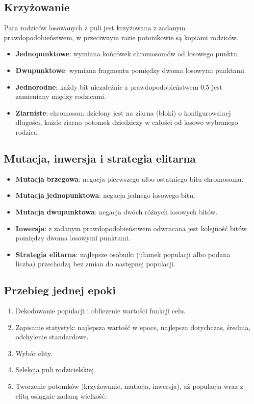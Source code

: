 \documentclass[11pt,a4paper]{article}
\begin{document}
\subsection{Krzyżowanie}
Para rodziców losowanych z puli jest krzyżowana z zadanym prawdopodobieństwem, w przeciwnym
razie potomkowie są kopiami rodziców.
\begin{itemize}
  \item \textbf{Jednopunktowe}: wymiana końcówek chromosomów od losowego punktu.
  \item \textbf{Dwupunktowe}: wymiana fragmentu pomiędzy dwoma losowymi punktami.
  \item \textbf{Jednorodne}: każdy bit niezależnie z prawdopodobieństwem 0.5 jest zamieniany między rodzicami.
  \item \textbf{Ziarniste}: chromosom dzielony jest na ziarna (bloki) o konfigurowalnej długości,
        każde ziarno potomek dziedziczy w całości od losowo wybranego rodzica.
\end{itemize}

\subsection{Mutacja, inwersja i strategia elitarna}
\begin{itemize}
  \item \textbf{Mutacja brzegowa}: negacja pierwszego albo ostatniego bitu chromosomu.
  \item \textbf{Mutacja jednopunktowa}: negacja jednego losowego bitu.
  \item \textbf{Mutacja dwupunktowa}: negacja dwóch różnych losowych bitów.
  \item \textbf{Inwersja}: z zadanym prawdopodobieństwem odwracana jest kolejność bitów
        pomiędzy dwoma losowymi punktami.
  \item \textbf{Strategia elitarna}: najlepsze osobniki (ułamek populacji albo podana liczba)
        przechodzą bez zmian do następnej populacji.
\end{itemize}

\subsection{Przebieg jednej epoki}
\begin{enumerate}
  \item Dekodowanie populacji i obliczenie wartości funkcji celu.
  \item Zapisanie statystyk: najlepsza wartość w epoce, najlepsza dotychczas, średnia, odchylenie standardowe.
  \item Wybór elity.
  \item Selekcja puli rodzicielskiej.
  \item Tworzenie potomków (krzyżowanie, mutacja, inwersja), aż populacja wraz z elitą osiągnie zadaną wielkość.
\end{enumerate}
\end{document}
